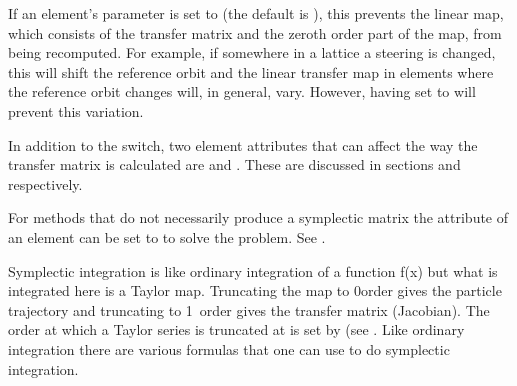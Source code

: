 If an element's  parameter is set to  (the default is ),
this prevents the linear map, which consists of the transfer matrix and the zeroth order part of the
map, from being recomputed. For example, if somewhere in a lattice a steering is changed, this will
shift the reference orbit and the linear transfer map in elements where the reference orbit changes
will, in general, vary. However, having  set to  will prevent this
variation.

In addition to the  switch, two element attributes that can affect the way the
transfer matrix is calculated are  and . These are
discussed in sections  and  respectively.

For methods that do not necessarily produce a symplectic matrix the  attribute of an
element can be set to  to solve the problem. See .

Symplectic integration is like ordinary integration of a function f(x) but what is integrated here
is a Taylor map. Truncating the map to 0\Th order gives the particle trajectory and truncating to
1\St\ order gives the transfer matrix (Jacobian).  The order at which a Taylor series is truncated
at is set by  (see . Like ordinary integration there are various
formulas that one can use to do symplectic integration.

